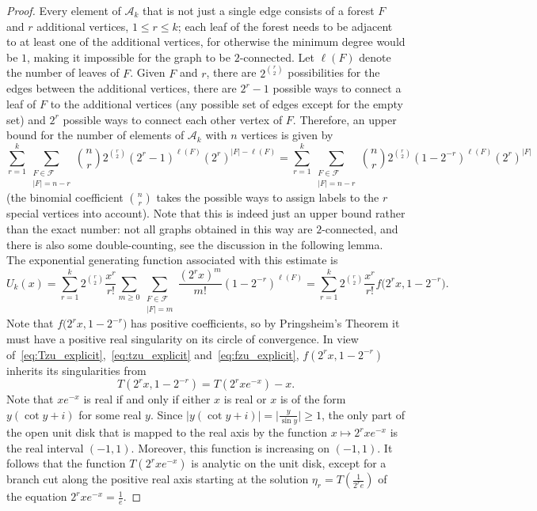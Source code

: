 \documentclass[a4paper]{article}
\newcommand{\A}{\mathcal{A}}
\newcommand{\F}{\mathcal{F}}
\theoremstyle{remark}
\begin{document}
\begin{proof}
Every element of $\A_k$ that is not just a single edge consists of a forest $F$ and $r$ additional vertices, $1 \leq r \leq k$; each leaf of the forest needs to be adjacent to at least one of the additional vertices, for otherwise the minimum degree would be $1$, making it impossible for the graph to be $2$-connected. Let $\ell(F)$ denote the number of leaves of $F$. Given $F$ and $r$, there are $2^{\binom{r}{2}}$ possibilities for the edges between the additional vertices, there are $2^r-1$ possible ways to connect a leaf of $F$ to the additional vertices (any possible set of edges except for the empty set) and $2^r$ possible ways to connect each other vertex of $F$. Therefore, an upper bound for the number of elements of $\A_k$ with $n$ vertices is given by
$$\sum_{r=1}^k \sum_{\substack{F \in \F \\ |F| = n-r}} \binom{n}{r} 2^{\binom{r}{2}} (2^r-1)^{\ell(F)}(2^r)^{|F|-\ell(F)} = \sum_{r=1}^k \sum_{\substack{F \in \F \\ |F| = n-r}} \binom{n}{r} 2^{\binom{r}{2}} (1 - 2^{-r})^{\ell(F)}(2^r)^{|F|} $$
(the binomial coefficient $\binom{n}{r}$ takes the possible ways to assign labels to the $r$ special vertices into account). Note that this is indeed just an upper bound rather than the exact number: not all graphs obtained in this way are $2$-connected, and there is also some double-counting, see the discussion in the following lemma. The exponential generating function associated with this estimate is
\begin{equation}\label{eq:upper_est}
U_k(x) = \sum_{r=1}^k 2^{\binom{r}{2}} \frac{x^r}{r!} \sum_{m \geq 0} \sum_{\substack{F \in \F \\ |F| = m}} \frac{(2^r x)^m}{m!}  (1-2^{-r})^{\ell(F)} = \sum_{r=1}^k 2^{\binom{r}{2}} \frac{x^r}{r!} f \big( 2^r x, 1-2^{-r}\big).
\end{equation}
Note that $f \big( 2^r x, 1-2^{-r}\big)$ has positive coefficients, so by Pringsheim's Theorem it must have a positive real singularity on its circle of convergence.
In view of~\eqref{eq:Tzu_explicit},~\eqref{eq:tzu_explicit} and~\eqref{eq:fzu_explicit}, $f(2^r x,1-2^{-r})$ inherits its singularities from 
\begin{equation}\label{T_simplified}
T(2^r x,1-2^{-r}) = T(2^r x e^{-x}) - x.
\end{equation}
Note that $x e^{-x}$ is real if and only if either $x$ is real or $x$ is of the form $y(\cot y + i)$ for some real $y$. Since $|y(\cot y +i)| = \big|\frac{y}{\sin y} \big| \geq 1$, the only part of the open unit disk that is mapped to the real axis by the function $x \mapsto 2^r x e^{-x}$ is the real interval $(-1,1)$. Moreover, this function is increasing on $(-1,1)$. It follows that the function $T(2^r x e^{-x})$ is analytic on the unit disk, except for a branch cut along the positive real axis starting at the solution $\eta_r = T(\frac{1}{2^r e})$ of the equation $2^r x e^{-x} = \frac1{e}$.


\end{proof}
\end{document}
